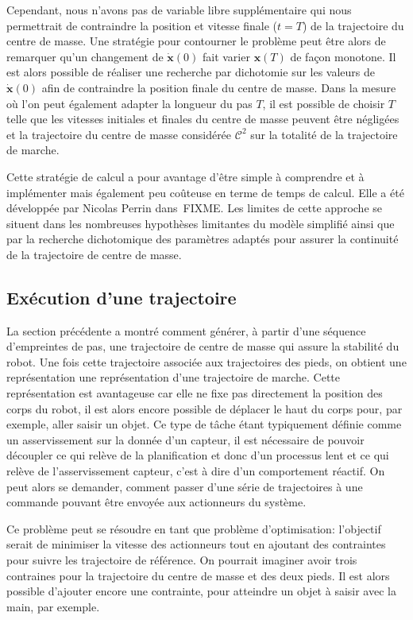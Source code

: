 Cependant, nous n'avons pas de variable libre supplémentaire qui nous
permettrait de contraindre la position et vitesse finale ($t=T$) de la
trajectoire du centre de masse. Une stratégie pour contourner le
problème peut être alors de remarquer qu'un changement de
$\dot{\mathbf{x}}(0)$ fait varier $\mathbf{x}(T)$ de façon
monotone. Il est alors possible de réaliser une recherche par
dichotomie sur les valeurs de $\dot{\mathbf{x}}(0)$ afin de
contraindre la position finale du centre de masse. Dans la mesure où
l'on peut également adapter la longueur du pas $T$, il est possible de
choisir $T$ telle que les vitesses initiales et finales du centre de
masse peuvent être négligées et la trajectoire du centre de masse
considérée $\mathcal{C}^2$ sur la totalité de la trajectoire de
marche.


Cette stratégie de calcul a pour avantage d'être simple à comprendre
et à implémenter mais également peu coûteuse en terme de temps de
calcul. Elle a été développée par Nicolas Perrin dans~FIXME. Les
limites de cette approche se situent dans les nombreuses hypothèses
limitantes du modèle simplifié ainsi que par la recherche dichotomique
des paramètres adaptés pour assurer la continuité de la trajectoire de
centre de masse.


\subsection{Exécution d'une trajectoire}


La section précédente a montré comment générer, à partir d'une
séquence d'empreintes de pas, une trajectoire de centre de masse qui
assure la stabilité du robot. Une fois cette trajectoire associée aux
trajectoires des pieds, on obtient une représentation une
représentation d'une trajectoire de marche. Cette représentation est
avantageuse car elle ne fixe pas directement la position des corps du
robot, il est alors encore possible de déplacer le haut du corps pour,
par exemple, aller saisir un objet. Ce type de tâche étant typiquement
définie comme un asservissement sur la donnée d'un capteur, il est
nécessaire de pouvoir découpler ce qui relève de la planification et
donc d'un processus lent et ce qui relève de l'asservissement capteur,
c'est à dire d'un comportement réactif. On peut alors se demander,
comment passer d'une série de trajectoires à une commande pouvant être
envoyée aux actionneurs du système.


Ce problème peut se résoudre en tant que problème d'optimisation:
l'objectif serait de minimiser la vitesse des actionneurs tout en
ajoutant des contraintes pour suivre les trajectoire de référence. On
pourrait imaginer avoir trois contraines pour la trajectoire du centre
de masse et des deux pieds. Il est alors possible d'ajouter encore une
contrainte, pour atteindre un objet à saisir avec la main, par
exemple.


